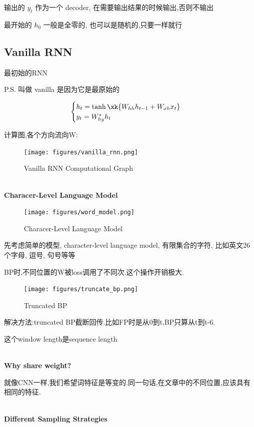 	输出的 $y_t$ 作为一个 decoder, 在需要输出结果的时候输出,否则不输出

	最开始的 $h_0$ 一般是全零的, 也可以是随机的,只要一样就行

	\subsection{Vanilla RNN}

	最初始的RNN

	P.S. 叫做 vanilla 是因为它是最原始的

	\begin{equation}
		\begin{cases}
			h_t = \tanh\xk{W_{hh}h_{t-1} + W_{xh}x_t}
			\\
			y_t = W_{hy}^*h_t
		\end{cases}
	\end{equation}
	
	计算图,各个方向流向W:
	
	\begin{figure}[htbp]
		\centering
		\texttt{[image: figures/vanilla\_rnn.png]}
		\caption{Vanilla RNN Computational Graph}
	\end{figure}
	
	\textbf{\\Characer-Level Language Model}

	\begin{figure}[htbp]
		\centering
		\texttt{[image: figures/word\_model.png]}
		\caption{Characer-Level Language Model}
	\end{figure}

	先考虑简单的模型, character-level language model, 有限集合的字符, 
	比如英文26个字母, 逗号, 句号等等

	BP时,不同位置的W被loss调用了不同次.这个操作开销极大.

	\begin{figure}[htbp]
		\centering
		\texttt{[image: figures/truncate\_bp.png]}
		\caption{Truncated BP}
	\end{figure}
	
	解决方法:truncated BP截断回传.比如FP时是从0到t,BP只算从t到t-6.

	这个window length是sequence length

	\textbf{\\Why share weight?} 
	
	就像CNN一样,我们希望词特征是等变的.同一句话,在文章中的不同位置,应该具有相同的特征.

	\textbf{\\Different Sampling Strategies}

